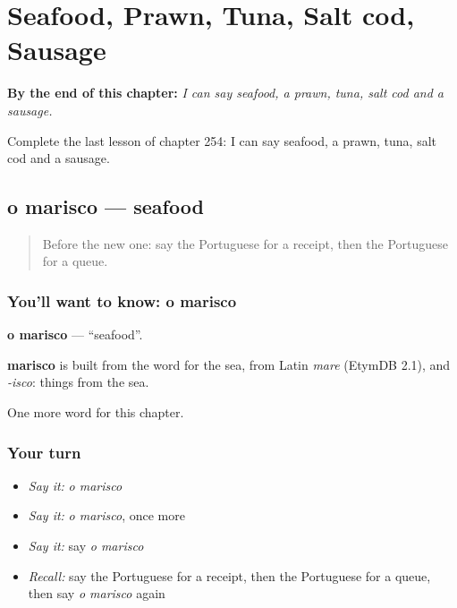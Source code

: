 
\chapter{Seafood, Prawn, Tuna, Salt cod, Sausage}
\label{ch:pt-seafood-prawn-tuna-salt-cod-sausage}

\begin{chapteropening}
\textbf{By the end of this chapter:} \emph{I can say seafood, a prawn, tuna, salt cod and a sausage.}

Complete the last lesson of chapter 254: I can say seafood, a prawn, tuna, salt cod and a sausage.
\end{chapteropening}

\section[o marisco]{o marisco — seafood}

\label{lesson:PT-C254-marisco}



\begin{quote}
Before the new one: say the Portuguese for a receipt, then the Portuguese for a queue.
\end{quote}

\subsection*{You'll want to know: o marisco}
\textbf{o marisco} — \textquotedblleft{}seafood\textquotedblright{}.

\begin{cousinweb}
\textbf{marisco} is built from the word for the sea, from Latin \emph{mare} (EtymDB 2.1), and \emph{-isco}: things from the sea.
\end{cousinweb}

\begin{grammarlens}[title={What you've built}]
One more word for this chapter.
\end{grammarlens}

\subsection*{Your turn}
\begin{itemize}
\raggedright
  \item \emph{Say it:} \emph{o marisco}
  \item \emph{Say it:} \emph{o marisco}, once more
  \item \emph{Say it:} say \emph{o marisco}
  \item \emph{Recall:} say the Portuguese for a receipt, then the Portuguese for a queue, then say \emph{o marisco} again
\end{itemize}

